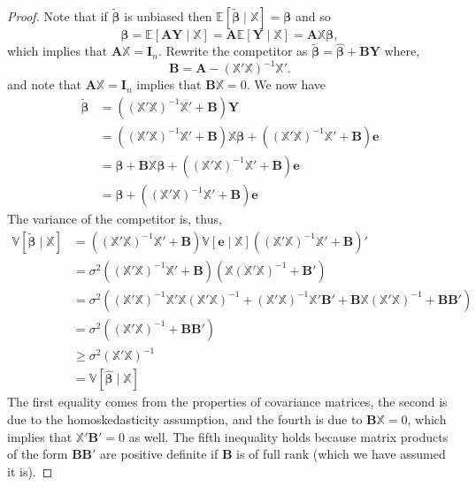 \documentclass[
  13pt,
  letterpaper,
  DIV=11,
  numbers=noendperiod]{scrreprt}
\newcommand{\mb}{\bm}
\newcommand{\E}{\mathbb{E}}
\newcommand{\V}{\mathbb{V}}
\newcommand{\Xmat}{\mathbb{X}}
\newcommand{\bfbeta}{\mb{\beta}}
\newcommand{\bhat}{\widehat{\mb{\beta}}}
\theoremstyle{plain}
\theoremstyle{plain}
\theoremstyle{definition}
\theoremstyle{definition}
\theoremstyle{remark}
\begin{document}
\begin{proof}
Note that if \(\widetilde{\bfbeta}\) is unbiased then
\(\E[\widetilde{\bfbeta} \mid \Xmat] = \bfbeta\) and so \[
\bfbeta = \E[\mb{AY} \mid \Xmat] = \mb{A}\E[\mb{Y} \mid \Xmat] = \mb{A}\Xmat\bfbeta,
\] which implies that \(\mb{A}\Xmat = \mb{I}_n\). Rewrite the competitor
as \(\widetilde{\bfbeta} = \bhat + \mb{BY}\) where, \[ 
\mb{B} = \mb{A} - \left(\Xmat'\Xmat\right)^{-1}\Xmat'.
\] and note that \(\mb{A}\Xmat = \mb{I}_n\) implies that
\(\mb{B}\Xmat = 0\). We now have \[ 
\begin{aligned}
  \widetilde{\bfbeta} &= \left( \left(\Xmat'\Xmat\right)^{-1}\Xmat' + \mb{B}\right)\mb{Y} \\
                      &= \left( \left(\Xmat'\Xmat\right)^{-1}\Xmat' + \mb{B}\right)\Xmat\bfbeta + \left( \left(\Xmat'\Xmat\right)^{-1}\Xmat' + \mb{B}\right)\mb{e} \\
                      &= \bfbeta + \mb{B}\Xmat\bfbeta + \left( \left(\Xmat'\Xmat\right)^{-1}\Xmat' + \mb{B}\right)\mb{e} \\
  &= \bfbeta + \left( \left(\Xmat'\Xmat\right)^{-1}\Xmat' + \mb{B}\right)\mb{e}
\end{aligned}
\] The variance of the competitor is, thus, \[ 
\begin{aligned}
  \V[\widetilde{\bfbeta} \mid \Xmat]
  &= \left( \left(\Xmat'\Xmat\right)^{-1}\Xmat' + \mb{B}\right)\V[\mb{e}\mid \Xmat]\left( \left(\Xmat'\Xmat\right)^{-1}\Xmat' + \mb{B}\right)' \\
  &= \sigma^{2}\left( \left(\Xmat'\Xmat\right)^{-1}\Xmat' + \mb{B}\right)\left( \Xmat\left(\Xmat'\Xmat\right)^{-1} + \mb{B}'\right) \\
  &= \sigma^{2}\left(\left(\Xmat'\Xmat\right)^{-1}\Xmat'\Xmat\left(\Xmat'\Xmat\right)^{-1} + \left(\Xmat'\Xmat\right)^{-1}\Xmat'\mb{B}' + \mb{B}\Xmat\left(\Xmat'\Xmat\right)^{-1} + \mb{BB}'\right)\\
  &= \sigma^{2}\left(\left(\Xmat'\Xmat\right)^{-1} + \mb{BB}'\right)\\
  &\geq \sigma^{2}\left(\Xmat'\Xmat\right)^{-1} \\
  &= \V[\bhat \mid \Xmat]
\end{aligned}
\] The first equality comes from the properties of covariance matrices,
the second is due to the homoskedasticity assumption, and the fourth is
due to \(\mb{B}\Xmat = 0\), which implies that \(\Xmat'\mb{B}' = 0\) as
well. The fifth inequality holds because matrix products of the form
\(\mb{BB}'\) are positive definite if \(\mb{B}\) is of full rank (which
we have assumed it is).
\end{proof}
\end{document}
